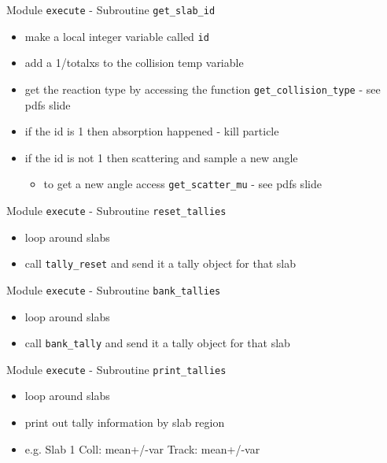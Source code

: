 \documentclass{beamer}
\begin{document}
\begin{frame}{Module \texttt{execute} - Subroutine \texttt{get\_slab\_id}}

  \begin{itemize}
    \item make a local integer variable called \texttt{id}
    \vfill\item add a 1/totalxs to the collision temp variable
    \vfill\item get the reaction type by accessing the function \texttt{get\_collision\_type} - see pdfs slide
    \vfill\item if the id is 1 then absorption happened - kill particle
    \vfill\item if the id is not 1 then scattering and sample a new angle
    \begin{itemize}
      \item to get a new angle access \texttt{get\_scatter\_mu} - see pdfs slide
    \end{itemize}
  \end{itemize}

\end{frame}
\begin{frame}{Module \texttt{execute} - Subroutine \texttt{reset\_tallies}}

  \begin{itemize}
    \item loop around slabs
    \vfill\item call \texttt{tally\_reset} and send it a tally object for that slab
  \end{itemize}

\end{frame}
\begin{frame}{Module \texttt{execute} - Subroutine \texttt{bank\_tallies}}

  \begin{itemize}
    \item loop around slabs
    \vfill\item call \texttt{bank\_tally} and send it a tally object for that slab
  \end{itemize}

\end{frame}
\begin{frame}{Module \texttt{execute} - Subroutine \texttt{print\_tallies}}

  \begin{itemize}
    \item loop around slabs
    \vfill\item print out tally information by slab region 
    \vfill\item e.g. Slab 1  Coll: mean+/-var  Track: mean+/-var
  \end{itemize}

\end{frame}
\end{document}
